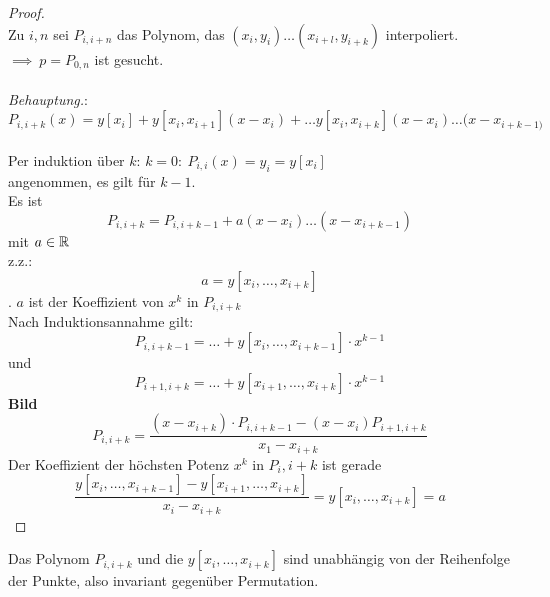 \documentclass[../Skript.tex]{subfiles}
\begin{document}
\begin{proof}\hfill\\
    Zu $i,n$ sei $P_{i,i+n}$ das Polynom, das $(x_i,y_i)\dots(x_{i+l},y_{i+k})$ interpoliert. $\implies \ p= P_{0,n}$ ist 
    gesucht.\\\\
    \emph{Behauptung.}:\(P_{i,i+k}(x)= y[x_i]+y[x_i,x_{i+1}](x-x_i)+\dots y[x_i,x_{i+k}](x-x_i)\dots (x-x_{i+k-1)} \)\\ \\
    Per induktion über $k$: $k=0 : \ P_{i,i}(x)=y_i=y[x_i]$ \\
    angenommen, es gilt für $k-1$.\\
    Es ist $$P_{i,i+k}=P_{i,i+k-1}+a(x-x_i)\dots(x-x_{i+k-1})$$ mit $a\in\mathbb{R}$\\
    z.z.: $$a=y[x_i,\dots ,x_{i+k}]$$. $a$ ist der Koeffizient von $x^k$ in $P_{i,i+k}$\\
    Nach Induktionsannahme gilt:\\
    \[P_{i,i+k-1}=\dots+y[x_i,\dots ,x_{i+k-1}]\cdot x^{k-1}\]
    und
    \[
    P_{i+1,i+k}=\dots+y[x_{i+1},\dots ,x_{i+k}]\cdot x^{k-1}
    \]
    \textbf{Bild}\\
    \[
    P_{i,i+k}=\frac{(x-x_{i+k})\cdot P_{i,i+k-1}-(x-x_i)P_{i+1,i+k}}{x_1-x_{i+k}}
    \]
    Der Koeffizient der höchsten Potenz $x^k$ in $P{_i, i+k}$ ist gerade\[
    \frac{y[x_i, \dots, x_{i+k-1}] - y[x_{i+1},\dots, x_{i+k}]}{x_i - x_{i+k}}
     = y[x_i, \dots, x_{i+k}] = a\]

\end{proof}
\begin{remark}
    Das Polynom $P_{i, i+k}$ und die $y[x_i, \dots, x_{i+k}]$ sind unabhängig von der Reihenfolge
    der Punkte, also invariant gegenüber Permutation.
\end{remark}
\end{document}
